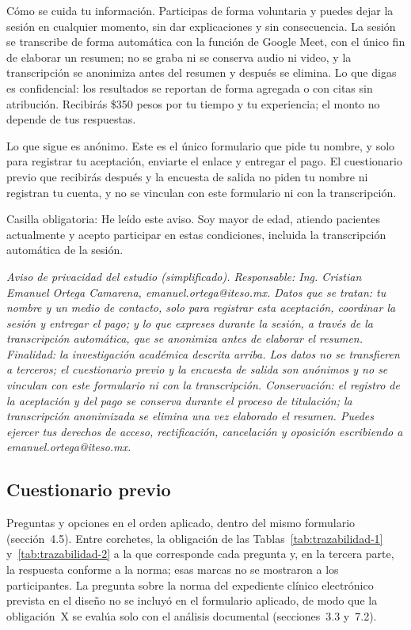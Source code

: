 \documentclass[12pt, a4paper]{article}
\begin{document}
Cómo se cuida tu información. Participas de forma voluntaria y puedes dejar la sesión en cualquier momento, sin dar explicaciones y sin consecuencia. La sesión se transcribe de forma automática con la función de Google Meet, con el único fin de elaborar un resumen; no se graba ni se conserva audio ni video, y la transcripción se anonimiza antes del resumen y después se elimina. Lo que digas es confidencial: los resultados se reportan de forma agregada o con citas sin atribución. Recibirás \$350 pesos por tu tiempo y tu experiencia; el monto no depende de tus respuestas.
 
Lo que sigue es anónimo. Este es el único formulario que pide tu nombre, y solo para registrar tu aceptación, enviarte el enlace y entregar el pago. El cuestionario previo que recibirás después y la encuesta de salida no piden tu nombre ni registran tu cuenta, y no se vinculan con este formulario ni con la transcripción.
 
Casilla obligatoria: He leído este aviso. Soy mayor de edad, atiendo pacientes actualmente y acepto participar en estas condiciones, incluida la transcripción automática de la sesión.
 
\textit{Aviso de privacidad del estudio (simplificado). Responsable: Ing. Cristian Emanuel Ortega Camarena, emanuel.ortega@iteso.mx. Datos que se tratan: tu nombre y un medio de contacto, solo para registrar esta aceptación, coordinar la sesión y entregar el pago; y lo que expreses durante la sesión, a través de la transcripción automática, que se anonimiza antes de elaborar el resumen. Finalidad: la investigación académica descrita arriba. Los datos no se transfieren a terceros; el cuestionario previo y la encuesta de salida son anónimos y no se vinculan con este formulario ni con la transcripción. Conservación: el registro de la aceptación y del pago se conserva durante el proceso de titulación; la transcripción anonimizada se elimina una vez elaborado el resumen. Puedes ejercer tus derechos de acceso, rectificación, cancelación y oposición escribiendo a emanuel.ortega@iteso.mx.}
 
\subsection{Cuestionario previo}
\label{anexo:cuestionario}
 
Preguntas y opciones en el orden aplicado, dentro del mismo formulario (sección~4.5). Entre corchetes, la obligación de las Tablas~\ref{tab:trazabilidad-1} y~\ref{tab:trazabilidad-2} a la que corresponde cada pregunta y, en la tercera parte, la respuesta conforme a la norma; esas marcas no se mostraron a los participantes. La pregunta sobre la norma del expediente clínico electrónico prevista en el diseño no se incluyó en el formulario aplicado, de modo que la obligación~X se evalúa solo con el análisis documental (secciones~3.3 y~7.2).
 
\end{document}
